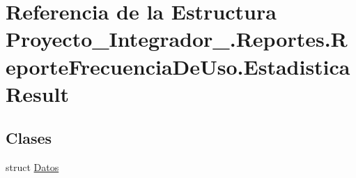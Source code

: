 \hypertarget{struct_proyecto___integrador__3_1_1_reportes_1_1_reporte_frecuencia_de_uso_1_1_estadistica_result}{\section{Referencia de la Estructura Proyecto\-\_\-\-Integrador\-\_.\-Reportes.\-Reporte\-Frecuencia\-De\-Uso.\-Estadistica\-Result}
\label{struct_proyecto___integrador__3_1_1_reportes_1_1_reporte_frecuencia_de_uso_1_1_estadistica_result}
}
\subsection*{Clases}
\begin{DoxyCompactItemize}
\item 
struct \hyperlink{struct_proyecto___integrador__3_1_1_reportes_1_1_reporte_frecuencia_de_uso_1_1_estadistica_result_1_1_datos}{Datos}
\end{DoxyCompactItemize}
